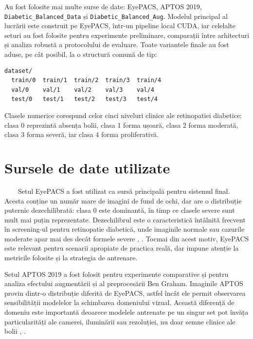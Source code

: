\documentclass[12pt, a4paper, twoside, romanian]{teza-upb}
\begin{document}
Au fost folosite mai multe surse de date: EyePACS, APTOS 2019, \texttt{Diabetic\_Balanced\_Data}
și \texttt{Diabetic\_Balanced\_Aug}. Modelul principal al lucrării este construit pe EyePACS,
într-un pipeline local CUDA, iar celelalte seturi au fost folosite pentru experimente
preliminare, comparații între arhitecturi și analiza robustă a protocolului de evaluare.
Toate variantele finale au fost aduse, pe cât posibil, la o structură comună de tip:

\begin{center}
\small
\begin{verbatim}
dataset/
  train/0  train/1  train/2  train/3  train/4
  val/0    val/1    val/2    val/3    val/4
  test/0   test/1   test/2   test/3   test/4
\end{verbatim}
\end{center}

Clasele numerice corespund celor cinci niveluri clinice ale retinopatiei diabetice: clasa 0
reprezintă absența bolii, clasa 1 forma ușoară, clasa 2 forma moderată, clasa 3 forma severă,
iar clasa 4 forma proliferativă.

\section{Sursele de date utilizate}

\ \ \ \ Setul EyePACS a fost utilizat ca sursă principală pentru sistemul final. Acesta conține
un număr mare de imagini de fund de ochi, dar are o distribuție puternic dezechilibrată:
clasa 0 este dominantă, în timp ce clasele severe sunt mult mai puțin reprezentate.
Dezechilibrul este o caracteristică întâlnită frecvent în screening-ul pentru retinopatie
diabetică, unde imaginile normale sau cazurile moderate apar mai des decât formele severe
\cite{3_gulshan2016development}, \cite{15_li2019diagnostic}. Tocmai din acest motiv, EyePACS
este relevant pentru scenarii apropiate de practica reală, dar impune atenție la metricile
folosite și la strategia de antrenare.
\bigskip

Setul APTOS 2019 a fost folosit pentru experimente comparative și pentru analiza efectului
augmentării și al preprocesării Ben Graham. Imaginile APTOS provin dintr-o distribuție diferită
de EyePACS, astfel încât ele permit observarea sensibilității modelelor la schimbarea
domeniului vizual. Această diferență de domeniu este importantă deoarece modelele antrenate
pe un singur set pot învăța particularități ale camerei, iluminării sau rezoluției, nu doar
semne clinice ale bolii \cite{8_zhang2022multi}, \cite{9_chetoui2020explainable}.
\bigskip
\end{document}
